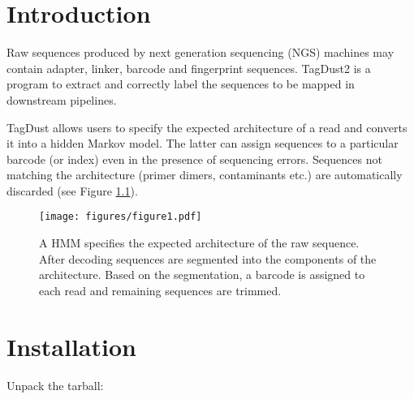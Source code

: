 \documentclass[11pt,a4paper,oneside]{book}
\begin{document}
\tableofcontents
\mainmatter

\chapter{Introduction}


Raw sequences produced by next generation sequencing (NGS) machines may contain adapter, linker, barcode and fingerprint sequences. TagDust2 is a program to extract and correctly label the sequences to be mapped in downstream pipelines.

TagDust allows users to specify the expected architecture of a read and converts it into a hidden Markov model. The latter can assign sequences to a particular barcode (or index) even in the presence of sequencing errors. Sequences not matching the architecture (primer dimers, contaminants etc.) are automatically discarded (see Figure \ref{figure1}).



\begin{figure}[h]


\texttt{[image: figures/figure1.pdf]}

\caption{A HMM specifies the expected architecture of the raw sequence. After decoding sequences are segmented into the components of the architecture. Based on the segmentation, a barcode is assigned to each read and remaining sequences are trimmed.}
\label{figure1}
\end{figure}



\newpage

\chapter{Installation}


Unpack the tarball:
\end{document}
